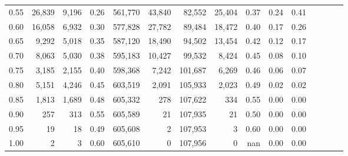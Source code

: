 \begin{tabular}{rrrcrrrrrrrrrrr}
0.55 &  26,839 &   9,196 &                                       0.26 &  561,770 &   43,840 &   82,552 &   25,404 &  0.37 &  0.24 &                         0.41 \\
0.60 &  16,058 &   6,932 &                                       0.30 &  577,828 &   27,782 &   89,484 &   18,472 &  0.40 &  0.17 &                         0.26 \\
0.65 &   9,292 &   5,018 &                                       0.35 &  587,120 &   18,490 &   94,502 &   13,454 &  0.42 &  0.12 &                         0.17 \\
0.70 &   8,063 &   5,030 &                                       0.38 &  595,183 &   10,427 &   99,532 &    8,424 &  0.45 &  0.08 &                         0.10 \\
0.75 &   3,185 &   2,155 &                                       0.40 &  598,368 &    7,242 &  101,687 &    6,269 &  0.46 &  0.06 &                         0.07 \\
0.80 &   5,151 &   4,246 &                                       0.45 &  603,519 &    2,091 &  105,933 &    2,023 &  0.49 &  0.02 &                         0.02 \\
0.85 &   1,813 &   1,689 &                                       0.48 &  605,332 &      278 &  107,622 &      334 &  0.55 &  0.00 &                         0.00 \\
0.90 &     257 &     313 &                                       0.55 &  605,589 &       21 &  107,935 &       21 &  0.50 &  0.00 &                         0.00 \\
0.95 &      19 &      18 &                                       0.49 &  605,608 &        2 &  107,953 &        3 &  0.60 &  0.00 &                         0.00 \\
1.00 &       2 &       3 &                                       0.60 &  605,610 &        0 &  107,956 &        0 &   nan &  0.00 &                         0.00 \\
\bottomrule
\end{tabular}
